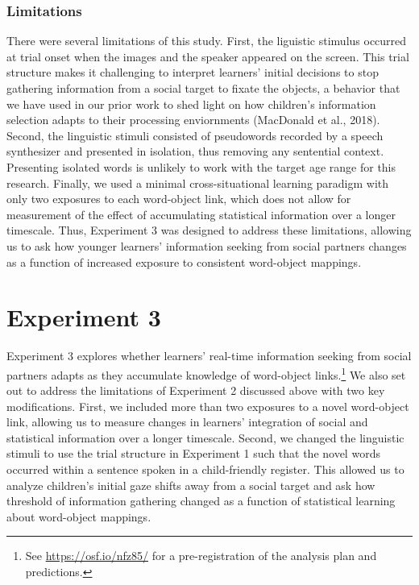 \documentclass[man,floatsintext]{apa6}
\let\rmarkdownfootnote\footnote%
\def\footnote{\protect\rmarkdownfootnote}
\begin{document}
\subsubsection{Limitations}\label{limitations}

There were several limitations of this study. First, the liguistic
stimulus occurred at trial onset when the images and the speaker
appeared on the screen. This trial structure makes it challenging to
interpret learners' initial decisions to stop gathering information from
a social target to fixate the objects, a behavior that we have used in
our prior work to shed light on how children's information selection
adapts to their processing enviornments (MacDonald et al., 2018).
Second, the linguistic stimuli consisted of pseudowords recorded by a
speech synthesizer and presented in isolation, thus removing any
sentential context. Presenting isolated words is unlikely to work with
the target age range for this research. Finally, we used a minimal
cross-situational learning paradigm with only two exposures to each
word-object link, which does not allow for measurement of the effect of
accumulating statistical information over a longer timescale. Thus,
Experiment 3 was designed to address these limitations, allowing us to
ask how younger learners' information seeking from social partners
changes as a function of increased exposure to consistent word-object
mappings.

\section{Experiment 3}\label{experiment-3}

Experiment 3 explores whether learners' real-time information seeking
from social partners adapts as they accumulate knowledge of word-object
links.\footnote{See \url{https://osf.io/nfz85/} for a pre-registration
  of the analysis plan and predictions.} We also set out to address the
limitations of Experiment 2 discussed above with two key modifications.
First, we included more than two exposures to a novel word-object link,
allowing us to measure changes in learners' integration of social and
statistical information over a longer timescale. Second, we changed the
linguistic stimuli to use the trial structure in Experiment 1 such that
the novel words occurred within a sentence spoken in a child-friendly
register. This allowed us to analyze children's initial gaze shifts away
from a social target and ask how threshold of information gathering
changed as a function of statistical learning about word-object
mappings.
\end{document}
